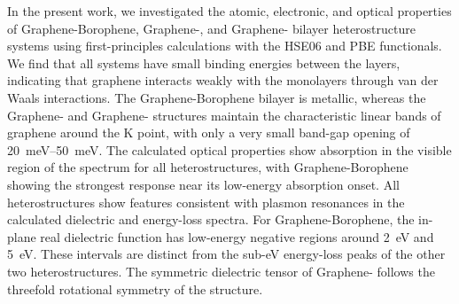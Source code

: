 In the present work,
we investigated the atomic, electronic, and optical properties of Graphene-Borophene,
Graphene-, and Graphene- bilayer heterostructure systems
using first-principles calculations with the HSE06 and PBE functionals.
We find that all systems have small binding energies between the layers,
indicating that graphene interacts weakly with the monolayers through van der Waals interactions.
The Graphene-Borophene bilayer is metallic,
whereas the Graphene- and Graphene- structures maintain the characteristic linear bands of graphene around the $\mathrm{K}$ point,
with only a very small band-gap opening of \qtyrange{20}{50}{\milli\electronvolt}.
The calculated optical properties show absorption in the visible region of the spectrum for all heterostructures,
with Graphene-Borophene showing the strongest response near its low-energy absorption onset.
All heterostructures show features consistent with plasmon resonances in the calculated dielectric and energy-loss spectra.
For Graphene-Borophene,
the in-plane real dielectric function has low-energy negative regions around \qty{2}{\electronvolt} and \qty{5}{\electronvolt}.
These intervals are distinct from the sub-eV energy-loss peaks of the other two heterostructures.
The symmetric dielectric tensor of Graphene- follows the threefold rotational symmetry of the structure.
